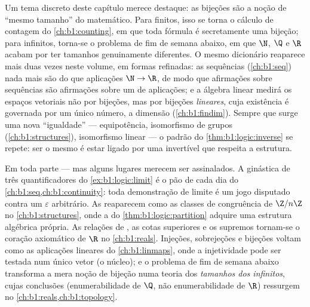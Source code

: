 \begin{remark}\label{rem:b1:logic:interlude}
Um tema discreto deste capítulo merece destaque: as bijeções são a noção
de ``mesmo tamanho'' do matemático. Para  finitos, isso se torna
o cálculo de contagem do \cref{ch:b1:counting}, em que toda fórmula é
secretamente uma bijeção; para  infinitos, torna-se o problema
de fim de semana abaixo, em que $\N$, $\Q$ e $\R$ acabam por ter tamanhos
genuinamente diferentes. O mesmo dicionário reaparece mais duas vezes
neste volume, em formas refinadas: as sequências (\cref{ch:b1:seq}) nada mais
são do que aplicações $\N \to \R$, de modo que afirmações sobre sequências
são afirmações sobre um  de aplicações; e a álgebra linear medirá
os espaços vetoriais não por bijeções, mas por bijeções \emph{lineares},
cuja existência é governada por um único número, a dimensão (\cref{ch:b1:findim}).
Sempre que surge uma nova ``igualdade'' --- equipotência, isomorfismo de
grupos (\cref{ch:b1:structures}), isomorfismo linear --- o padrão do \cref{thm:b1:logic:inverse} se
repete: ser o mesmo é estar ligado por uma  invertível que
respeita a estrutura.
\end{remark}

\begin{remark}\label{rem:b1:logic:whereused}
Em toda parte --- mas alguns lugares merecem ser assinalados. A ginástica
de três quantificadores do \cref{ex:b1:logic:limit} é o pão de cada dia do
\cref{ch:b1:seq,ch:b1:continuity}: toda demonstração de limite é um jogo disputado
contra um $\varepsilon$ arbitrário. As  reaparecem
como as classes de congruência de $\Z/n\Z$ no \cref{ch:b1:structures}, onde a
 do \cref{thm:b1:logic:partition} adquire uma estrutura algébrica própria. As
relações de , as cotas superiores e os supremos tornam-se o coração
axiomático de $\R$ no \cref{ch:b1:reals}. Injeções, sobrejeções e bijeções
voltam como as aplicações lineares do \cref{ch:b1:linmaps}, onde a injetividade
pode ser testada num único vetor (o núcleo); e o problema de fim de
semana abaixo transforma a mera noção de bijeção numa teoria dos
\emph{tamanhos dos  infinitos}, cujas conclusões
(enumerabilidade de $\Q$, não enumerabilidade de $\R$) ressurgem no
\cref{ch:b1:reals,ch:b1:topology}.
\end{remark}

